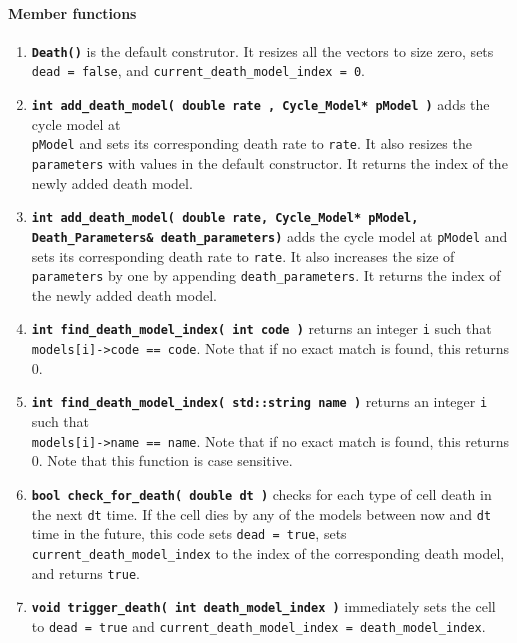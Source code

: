 \documentclass[12pt]{article}
\renewcommand{\v}{\verb}
\newcommand{\smallcode}[1]{\textbf{\texttt{#1}}}
\begin{document}
\paragraph{Member functions}
\begin{enumerate}
\item
\smallcode{Death()} is the default construtor. It resizes all the vectors to size zero, sets 
\v|dead = false|, and \v|current_death_model_index = 0|. 

\item
\smallcode{int add\_death\_model( double rate , Cycle\_Model* pModel )} adds the cycle model 
at \\ \v|pModel| and sets its corresponding death rate to \v|rate|. It also resizes 
the \v|parameters| with values in the default constructor. It returns the 
index of the newly added death model. 

\item 
\smallcode{int add\_death\_model( double rate, Cycle\_Model* pModel, \\
\phantom{int }Death\_Parameters\& death\_parameters)} adds the cycle model 
at \v|pModel| and sets its corresponding death rate to \v|rate|. It also increases the size of  
\v|parameters| by one by appending \v|death_parameters|. It returns the 
index of the newly added death model. 

\item 
\smallcode{int find\_death\_model\_index( int code )} returns an integer \v|i| such that \\
\v|models[i]->code == code|. Note that if no exact match is found, this returns 0.

\item 
\smallcode{int find\_death\_model\_index( std::string name )} returns an integer \v|i| such that \\
\v|models[i]->name == name|. Note that if no exact match is found, this returns 0. 
Note that this function is case sensitive. 

\item 
\smallcode{bool check\_for\_death( double dt )} checks for each type of cell death in the next 
\v|dt| time. If the cell dies by any of the models between now and 
\v|dt| time in the future, this code sets \v|dead = true|, sets \v|current_death_model_index| to the index of 
the corresponding death model, and returns \v|true|. 

\item 
\smallcode{void trigger\_death( int death\_model\_index )} immediately sets the cell to \v|dead = true| 
and \v|current_death_model_index = death_model_index|. 


\end{enumerate}
\end{document}
